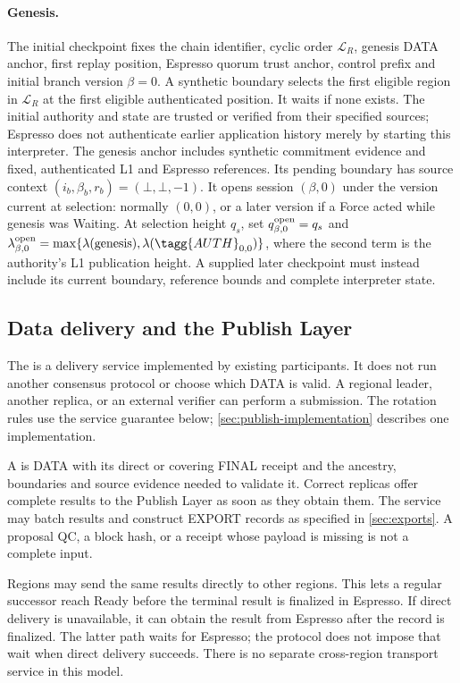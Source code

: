 \paragraph{Genesis.}
The initial checkpoint fixes the chain identifier, cyclic order
$\mathcal L_R$, genesis DATA anchor, first replay position, Espresso
quorum trust anchor, control prefix and initial branch version $\beta=0$.
A synthetic boundary selects the first eligible region in
$\mathcal L_R$ at the first eligible authenticated position. It waits
if none exists. The initial authority and state are trusted or verified
from their specified sources; Espresso does not authenticate earlier
application history merely by starting this interpreter.
The genesis anchor includes synthetic commitment evidence and fixed,
authenticated L1 and Espresso references. Its pending boundary has
source context $(i_b,\beta_b,r_b)=(\bot,\bot,-1)$. It opens
session $(\beta,0)$ under the version current at selection: normally
$(0,0)$, or a later version if a Force acted while genesis was Waiting.
At selection height $q_s$, set $q^{\rm open}_{\beta,0}=q_s$ and
$\lambda^{\rm open}_{\beta,0}=\max\{\lambda(\text{genesis}),
\lambda(\tagg{AUTH}_{0,0})\}$, where the second term is the authority's
L1 publication height. A supplied later checkpoint must instead include
its current boundary, reference bounds and complete interpreter state.

\subsection{Data delivery and the Publish Layer}
\label{sec:delivery}
The  is a delivery service implemented by existing
participants. It does not run another consensus protocol or choose which
DATA is valid. A regional leader, another replica, or an external verifier
can perform a submission. The rotation rules use the service guarantee
below; \cref{sec:publish-implementation} describes one implementation.

A  is DATA with its direct or covering
FINAL receipt and the ancestry, boundaries and source evidence needed to
validate it. Correct replicas offer complete results to the Publish Layer
as soon as they obtain them. The service may batch results and construct
EXPORT records as specified in \cref{sec:exports}. A proposal QC, a block
hash, or a receipt whose payload is missing is not a complete input.

Regions may send the same results directly to other regions. This lets a
regular successor reach Ready before the terminal result is finalized in
Espresso. If direct delivery is unavailable, it can obtain the result from
Espresso after the record is finalized. The latter path waits for Espresso; the
protocol does not impose that wait when direct delivery succeeds.
There is no separate cross-region transport service in this model.

